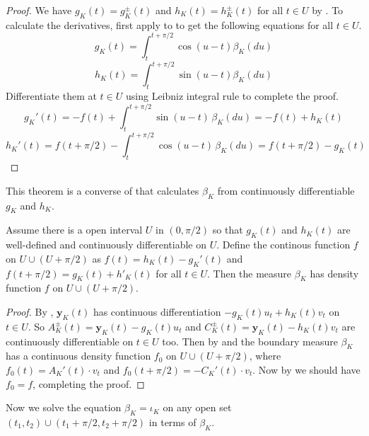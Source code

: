 \begin{proof}
We have \(g_K(t) = g_K^{\pm}(t)\) and \(h_K(t) = h_K^{\pm}(t)\) for all \(t \in U\) by . To calculate the derivatives, first apply  to  to get the following equations for all \(t \in U\).
\[
g_{K}(t) = \int_{t}^{t+\pi/2} \cos \left( u - t \right) \beta_K(du)
\]
\[
h_{K}(t) = \int_{t}^{t+\pi/2} \sin \left( u - t \right) \beta_K(du)
\]
Differentiate them at \(t \in U\) using Leibniz integral rule to complete the proof.
\[
g_{K}'(t) = -f(t) + \int_{t}^{t+\pi/2} \sin (u-t)\, \beta_K(du) = -f(t) + h_{K}(t) 
\]
\[
h_{K}'(t) = f\left( t + \pi/2 \right) - \int_{t}^{t+\pi/2} \cos (u-t)\, \beta_K(du) = f(t + \pi/2) - g_{K}(t)
\]

\end{proof}

This theorem is a converse of  that calculates \(\beta_K\) from continuously differentiable \(g_K\) and \(h_K\).

\begin{theorem}

Assume there is a open interval \(U\) in \((0, \pi/2)\) so that \(g_K(t)\) and \(h_K(t)\) are well-defined and continuously differentiable on \(U\). Define the continous function \(f\) on \(U \cup (U + \pi/2)\) as \(f(t) = h_K(t) - g_K'(t)\) and \(f(t + \pi/2) = g_K(t) + h'_K(t)\) for all \(t \in U\). Then the measure \(\beta_K\) has density function \(f\) on \(U \cup (U + \pi/2)\).

\label{thm:arm-length-derivative-converse}
\end{theorem}

\begin{proof}
By , \(\mathbf{y}_K(t)\) has continuous differentiation \(-g_K(t) u_t + h_K(t) v_t\) on \(t \in U\). So \(A_K^{\pm}(t) = \mathbf{y}_K(t) - g_K(t) u_t\) and \(C_K^{\pm}(t) = \mathbf{y}_K(t) - h_K(t) v_t\) are continuously differentiable on \(t \in U\) too. Then by  and  the boundary measure \(\beta_K\) has a continuous density function \(f_0\) on \(U \cup (U + \pi/2)\), where \(f_0(t) = A_K'(t) \cdot v_t\) and \(f_0(t + \pi/2) = - C_K'(t) \cdot v_t\). Now by  we should have \(f_0 = f\), completing the proof.
\end{proof}

Now we solve the equation \(\beta_K = \iota_K\) on any open set \((t_1, t_2) \cup (t_1 + \pi/2, t_2 + \pi/2)\) in terms of \(\beta_K\).

